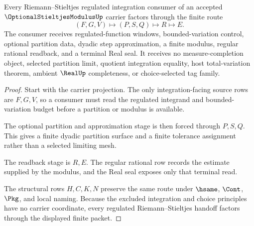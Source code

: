 \begin{theorem}
\label{thm:optional-stieltjes-modulus-rs-handoff}
Every Riemann--Stieltjes regulated integration consumer of an accepted $\OptionalStieltjesModulusUp$ carrier factors through the finite route
$$
(F,G,V) \longmapsto (P,S,Q) \longmapsto R \longmapsto E .
$$
The consumer receives regulated-function windows, bounded-variation control, optional partition data, dyadic step approximation, a finite modulus, regular rational readback, and a terminal Real seal. It receives no measure-completion object, selected partition limit, quotient integration equality, host total-variation theorem, ambient $\RealUp$ completeness, or choice-selected tag family.
\end{theorem}
\begin{proof}
Start with the carrier projection. The only integration-facing source rows are $F,G,V$, so a consumer must read the regulated integrand and bounded-variation budget before a partition or modulus is available.

The optional partition and approximation stage is then forced through $P,S,Q$. This gives a finite dyadic partition surface and a finite tolerance assignment rather than a selected limiting mesh.

The readback stage is $R,E$. The regular rational row records the estimate supplied by the modulus, and the Real seal exposes only that terminal read.

The structural rows $H,C,K,N$ preserve the same route under $\hsame$, $\Cont$, $\Pkg$, and local naming. Because the excluded integration and choice principles have no carrier coordinate, every regulated Riemann--Stieltjes handoff factors through the displayed finite packet.
\end{proof}



